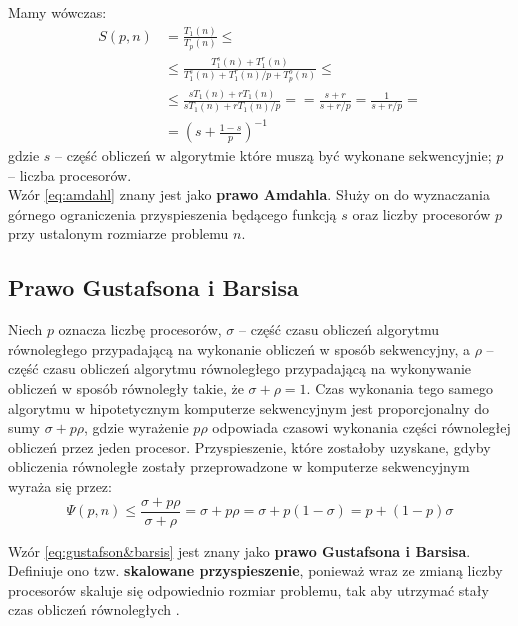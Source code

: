 Mamy wówczas:
\begin{equation}\label{eq:amdahl}
\begin{split}
S(p, n) &= \frac{T_{1}(n)}{T_{p}(n)}\leq\\
&\leq \frac{T^{s}_{1}(n) + T^{r}_{1}(n)}{T^{s}_{1}(n) + T^{r}_{1}(n)/p + T^{o}_{p}(n)}\leq\\
&\leq \frac{sT_{1}(n) + rT_{1}(n)}{sT_{1}(n) + rT_{1}(n)/p} =
= \frac{s+r}{s+r/p} = \frac{1}{s+r/p}= \\
&= \left(s+\frac{1-s}{p}\right)^{-1}
\end{split}
\end{equation}
gdzie \(s\) – część obliczeń w algorytmie które muszą być wykonane sekwencyjnie; \(p\) – liczba procesorów.\\

Wzór \eqref{eq:amdahl} znany jest jako \textbf{prawo Amdahla}. Służy on do wyznaczania górnego ograniczenia przyspieszenia będącego funkcją \(s\) oraz liczby procesorów \(p\) przy ustalonym rozmiarze problemu \(n\).


\subsection{Prawo Gustafsona i Barsisa}

Niech \(p\) oznacza liczbę procesorów, \(\sigma\) -- część czasu obliczeń algorytmu równoległego przypadającą na wykonanie obliczeń w sposób sekwencyjny, a \(\rho\) -- część czasu obliczeń algorytmu równoległego przypadającą na wykonywanie obliczeń w sposób równoległy takie, że \(\sigma+\rho=1\). Czas wykonania tego samego algorytmu w hipotetycznym komputerze sekwencyjnym jest proporcjonalny do sumy \(\sigma + p\rho\), gdzie wyrażenie \(p\rho\) odpowiada czasowi wykonania części równoległej obliczeń przez jeden procesor. Przyspieszenie, które zostałoby uzyskane, gdyby obliczenia równoległe zostały przeprowadzone w komputerze sekwencyjnym wyraża się przez:
\begin{equation}\label{eq:gustafson&barsis}
\Psi(p,n)\leq\frac{\sigma+p\rho}{\sigma+\rho}=\sigma+p\rho=\sigma+p\left(1-\sigma\right)=p+\left(1-p\right)\sigma
\end{equation}

Wzór \eqref{eq:gustafson&barsis} jest znany jako \textbf{prawo Gustafsona i Barsisa}. Definiuje ono tzw. \textbf{skalowane przyspieszenie}, ponieważ wraz ze zmianą liczby procesorów skaluje się odpowiednio rozmiar problemu, tak aby utrzymać stały czas obliczeń równoległych \cite{Czech}.

